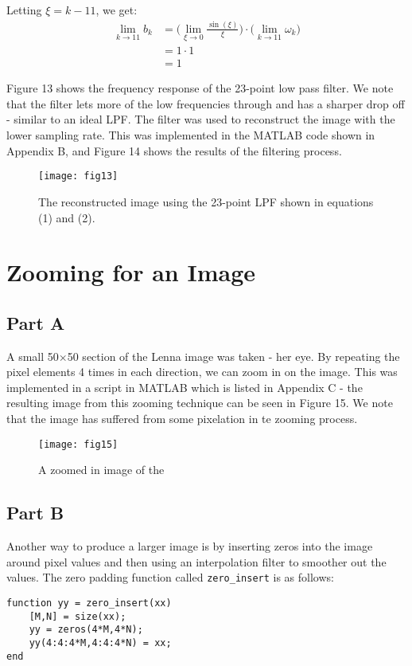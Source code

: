 \documentclass{article}
\begin{document}
Letting $\xi = k-11$, we get:
\begin{align*}
	\lim_{k \rightarrow 11} b_k &= \bigg(\lim_{\xi \rightarrow 0} \frac{\sin (\xi)}{\xi} \bigg) \cdot \bigg(\lim_{k \rightarrow 11} \omega_k \bigg)\\
								&= 1 \cdot 1\\
								&= 1
\end{align*}

Figure 13 shows the frequency response of the 23-point low pass filter. We note that the filter lets more of the low frequencies through and has a sharper drop off - similar to an ideal LPF. The filter was used to reconstruct the image with the lower sampling rate. This was implemented in the MATLAB code shown in Appendix B, and Figure 14 shows the results of the filtering process.

\begin{figure}
	\centering
	\texttt{[image: fig13]}
	\caption{The reconstructed image using the 23-point LPF shown in equations (1) and (2).}
\end{figure}

\section{Zooming for an Image}

\subsection{Part A}
A small 50$\times$50 section of the Lenna image was taken - her eye. By repeating the pixel elements 4 times in each direction, we can zoom in on the image. This was implemented in a script in MATLAB which is listed in Appendix C - the resulting image from this zooming technique can be seen in Figure 15. We note that the image has suffered from some pixelation in te zooming process.
\begin{figure}[H]
	\centering
	\texttt{[image: fig15]}
	\caption{A zoomed in image of the }
\end{figure} 

\subsection{Part B}
Another way to produce a larger image is by inserting zeros into the image around pixel values and then using an interpolation filter to smoother out the values. The zero padding function called \verb|zero_insert| is as follows:
\begin{lstlisting}
function yy = zero_insert(xx)
	[M,N] = size(xx);
	yy = zeros(4*M,4*N);
	yy(4:4:4*M,4:4:4*N) = xx;
end
\end{lstlisting}
\end{document}
